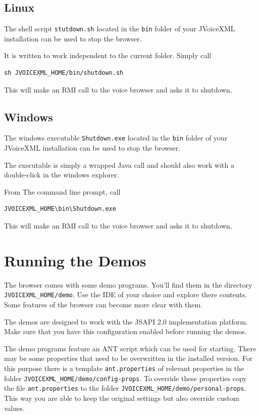 \documentclass[11pt,a4paper]{book}
\begin{document}
\subsection{Linux}

The shell script \texttt{stutdown.sh} located in the \texttt{bin} folder
of your JVoiceXML installation can be used to stop the browser.

It is written to work independent to the current folder. Simply call

\begin{lstlisting}
sh JVOICEXML_HOME/bin/shutdown.sh
\end{lstlisting}

This will make an RMI call to the voice browser and asks it to shutdown.

\subsection{Windows}

The windows executable \texttt{Shutdown.exe} located in the \texttt{bin}
folder of your JVoiceXML installation can be used to stop the browser.

The executable is simply a wrapped Java call and should also work with a
double-click in the windows explorer.

From The command line prompt, call

\begin{lstlisting}
JVOICEXML_HOME\bin\Shutdown.exe
\end{lstlisting}

This will make an RMI call to the voice browser and asks it to shutdown.

\section{Running the Demos}

The browser comes with some demo programs. You'll find them in the
directory \texttt{JVOICEXML\_HOME/demo}. Use the IDE of your choice
and explore there contents. Some features of the browser can 
become more clear with them.

The demos are designed to work with the JSAPI 2.0 implementation platform. Make
sure that you have this configuration enabled before running the demos.

The demo programs feature an ANT script which can be used for starting.
There may be some properties that need to be overwritten in the installed
version. For this purpose there is a template \lstinline{ant.properties} of
relevant properties in the folder \lstinline{JVOICEXML_HOME/demo/config-props}.
To override these properties copy the file \texttt{ant.properties} to the
folder \lstinline{JVOICEXML_HOME/demo/personal-props}. This way you are able
to keep the original settings but also override custom values.
\end{document}
